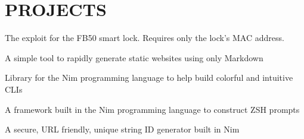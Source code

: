 \documentclass[]{resume-openfont}
\begin{document}
\begin{minipage}[t]{0.66\textwidth}

\section{PROJECTS}

The exploit for the FB50 smart lock. Requires only the lock's MAC address. \\
\sectionsep

A simple tool to rapidly generate static websites using only Markdown \\
\sectionsep

Library for the Nim programming language to help build colorful and intuitive CLIs
\sectionsep

A framework built in the Nim programming language to construct ZSH prompts
\sectionsep

A secure, URL friendly, unique string ID generator built in Nim
\sectionsep

\end{minipage} 
\end{document}
